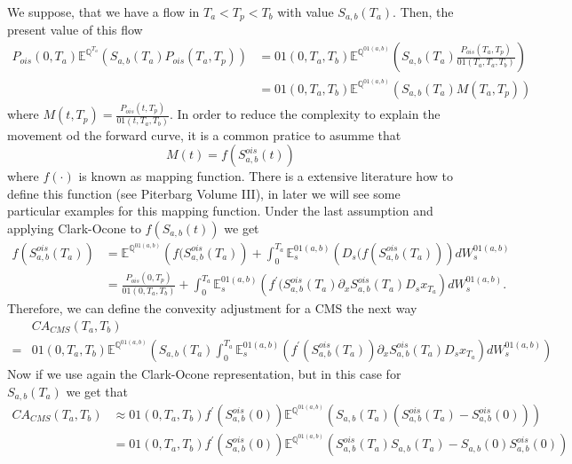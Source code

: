 \documentclass[a4paper,10pt]{article}
\newcommand{\1}{\mathbf{1}}
\begin{document}
We suppose, that we have a flow in $T_a < T_p < T_b$ with value $S_{a,b}(T_a)$. Then, the present value of this flow
\begin{align}\label{cms_expedted_value}
P_{ois}(0,T_a)\mathbb{E}^{\mathbb{Q}^{T_{a}}}\left(S_{a,b}(T_a) P_{ois}(T_a,T_p) \right) &= 01(0,T_a,T_b) \mathbb{E}^{\mathbb{Q}^{01(a,b)}}\left(S_{a,b}(T_a) \frac{P_{ois}(T_a,T_p)}{01(T_a,T_a,T_b) }\right) \nonumber \\
&= 01(0,T_a,T_b) \mathbb{E}^{\mathbb{Q}^{01(a,b)}}\left(S_{a,b}(T_a) M(T_a,T_p)\right)
\end{align}
where $M(t, T_p)= \frac{P_{ois}(t,T_p) }{01(t,T_a,T_b)} $. In order to reduce the complexity to explain the movement od the forward curve, it is a common pratice to asumme that
\begin{equation*}
M(t) = f(S^{ois}_{a,b}(t))
\end{equation*}
where $f(\cdot)$ is known as mapping function. There is a extensive literature how to define this function (see Piterbarg Volume III), in later we will see some particular examples for this mapping function. Under the last assumption and applying Clark-Ocone to $f(S_{a,b}(t))$ we get
\begin{align*}
f(S^{ois}_{a,b}(T_a)) &= \mathbb{E}^{\mathbb{Q}^{01(a,b)}}\left(f(S^{ois}_{a,b}(T_a)\right) + \int_{0}^{T_a} \mathbb{E}_s^{01(a,b)}\left( D_s (f(S^{ois}_{a,b}(T_a)) \right) dW^{01(a,b)}_{s} \\
&= \frac{P_{ois}(0,T_p) }{01(0,T_a,T_b)} + \int_{0}^{T_a} \mathbb{E}_s^{01(a,b)}\left(f^{\prime}(S^{ois}_{a,b}(T_a) \partial_{x}S^{ois}_{a,b}(T_a) D_s x_{T_a} \right) dW^{01(a,b)}_{s}. 
\end{align*}
Therefore, we can define the convexity adjustment for a CMS the next way
\begin{align*}
&CA_{CMS}(T_a,T_b)  \\
=&01(0,T_a,T_b) \mathbb{E}^{\mathbb{Q}^{01(a,b)}}\left(S_{a,b}(T_a) \int_{0}^{T_a} \mathbb{E}_s^{01(a,b)}\left( f^{\prime}(S^{ois}_{a,b}(T_a)) \partial_{x}S^{ois}_{a,b}(T_a) D_s x_{T_a} \right) dW^{01(a,b)}_{s} \right)
\end{align*}
Now if we use again the Clark-Ocone representation, but in this case for $S_{a,b}(T_a)$ we get that
\begin{align*}
CA_{CMS}(T_a,T_b) &\approx 01(0,T_a,T_b)  f^{\prime}(S^{ois}_{a,b}(0)) \mathbb{E}^{\mathbb{Q}^{01(a,b)}}\left(S_{a,b}(T_a) \left( S^{ois}_{a,b}(T_a) - S^{ois}_{a,b}(0)\right)\right) \\
&= 01(0,T_a,T_b)  f^{\prime}(S^{ois}_{a,b}(0)) \mathbb{E}^{\mathbb{Q}^{01(a,b)}}\left(S^{ois}_{a,b}(T_a)S_{a,b}(T_a) -  S_{a,b}(0) S^{ois}_{a,b}(0)\right)
\end{align*}
\end{document}
